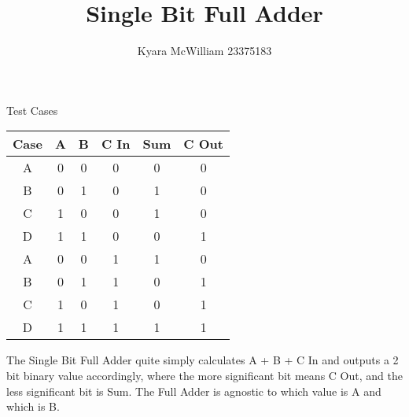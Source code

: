 \documentclass{article}
\title{Single Bit Full Adder}
\author{Kyara McWilliam 23375183}
\date{}
\begin{document}
\maketitle

Test Cases
\hfill \break

\begin{tabular}{ |c|c|c|c|c|c| }
\hline
Case & A & B & C In & Sum & C Out \\
\hline
A & 0 & 0 & 0 & 0 & 0 \\
B & 0 & 1 & 0 & 1 & 0 \\
C & 1 & 0 & 0 & 1 & 0 \\
D & 1 & 1 & 0 & 0 & 1 \\
A & 0 & 0 & 1 & 1 & 0 \\
B & 0 & 1 & 1 & 0 & 1 \\
C & 1 & 0 & 1 & 0 & 1 \\
D & 1 & 1 & 1 & 1 & 1 \\
\hline
\end{tabular}
\hfill \break \break
The Single Bit Full Adder quite simply calculates A + B + C In and outputs a 2 bit binary value accordingly, where the more significant bit means \hfill \break C Out, and the less significant bit is Sum. The Full Adder is agnostic to which value is A and which is B.
\end{document}
